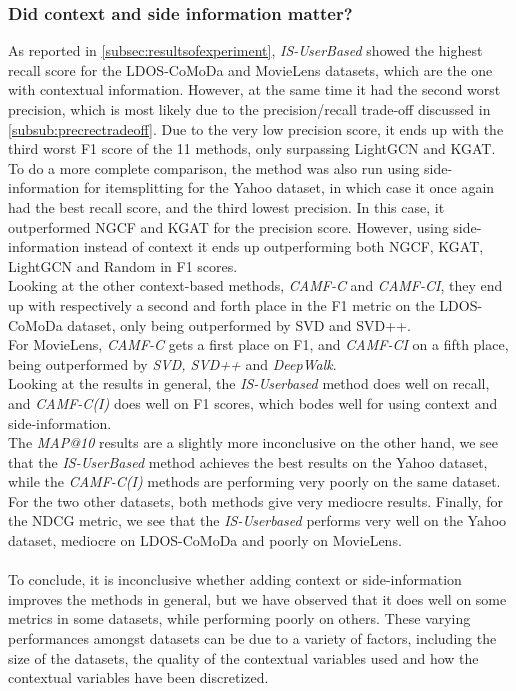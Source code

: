 \subsubsection{Did context and side information matter?} %
As reported in \autoref{subsec:resultsofexperiment}, \textit{IS-UserBased} showed the highest recall score for the LDOS-CoMoDa and MovieLens datasets, which are the one with contextual information.
However, at the same time it had the second worst precision, which is most likely due to the precision/recall trade-off discussed in \autoref{subsub:precrectradeoff}.
Due to the very low precision score, it ends up with the third worst F1 score of the 11 methods, only surpassing LightGCN and KGAT.
To do a more complete comparison, the method was also run using side-information for itemsplitting for the Yahoo dataset, in which case it once again had the best recall score, and the third lowest precision.
In this case, it outperformed NGCF and KGAT for the precision score.
However, using side-information instead of context it ends up outperforming both NGCF, KGAT, LightGCN and Random in F1 scores.\\
Looking at the other context-based methods, \textit{CAMF-C} and \textit{CAMF-CI}, they end up with respectively a second and forth place in the F1 metric on the LDOS-CoMoDa dataset, only being outperformed by SVD and SVD++.\\
For MovieLens, \textit{CAMF-C} gets a first place on F1, and \textit{CAMF-CI} on a fifth place, being outperformed by \textit{SVD, SVD++} and \textit{DeepWalk}.\\
Looking at the results in general, the \textit{IS-Userbased} method does well on recall, and \textit{CAMF-C(I)} does well on F1 scores, which bodes well for using context and side-information.\\
The \textit{MAP@10} results are a slightly more inconclusive on the other hand, we see that the \textit{IS-UserBased} method achieves the best results on the Yahoo dataset, while the \textit{CAMF-C(I)} methods are performing very poorly on the same dataset.
For the two other datasets, both methods give very mediocre results.
Finally, for the NDCG metric, we see that the \textit{IS-Userbased} performs very well on the Yahoo dataset, mediocre on LDOS-CoMoDa and poorly on MovieLens.\\\\
To conclude, it is inconclusive whether adding context or side-information improves the methods in general, but we have observed that it does well on some metrics in some datasets, while performing poorly on others.
These varying performances amongst datasets can be due to a variety of factors, including the size of the datasets, the quality of the contextual variables used and how the contextual variables have been discretized.

